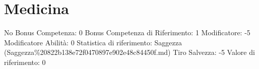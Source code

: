 \section{Medicina}\label{medicina}

\begin{description}
\tightlist
\item[Tags: ABI]
No Bonus Competenza: 0 Bonus Competenza di Riferimento: 1 Modificatore:
-5 Modificatore Abilità: 0 Statistica di riferimento: Saggezza
(Saggezza\%20822b138e72f0470897e902e48c84450f.md) Tiro Salvezza: -5
Valore di riferimento: 0
\end{description}
